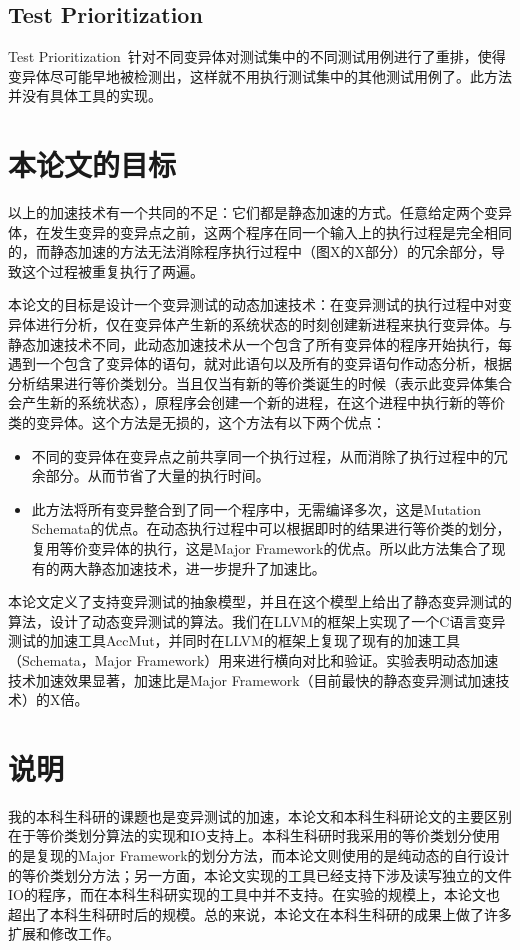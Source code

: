 \documentclass[nofonts]{ctexrep}
\begin{document}
\subsection{Test Prioritization}
Test Prioritization~\cite{zhang2013faster}针对不同变异体对测试集中的不同测试用例进行了重排，使得变异体尽可能早地被检测出，这样就不用执行测试集中的其他测试用例了。此方法并没有具体工具的实现。


\section{本论文的目标}
以上的加速技术有一个共同的不足：它们都是静态加速的方式。任意给定两个变异体，在发生变异的变异点之前，这两个程序在同一个输入上的执行过程是完全相同的，而静态加速的方法无法消除程序执行过程中（图X的X部分）的冗余部分，导致这个过程被重复执行了两遍。

本论文的目标是设计一个变异测试的动态加速技术：在变异测试的执行过程中对变异体进行分析，仅在变异体产生新的系统状态的时刻创建新进程来执行变异体。与静态加速技术不同，此动态加速技术从一个包含了所有变异体的程序开始执行，每遇到一个包含了变异体的语句，就对此语句以及所有的变异语句作动态分析，根据分析结果进行等价类划分。当且仅当有新的等价类诞生的时候（表示此变异体集合会产生新的系统状态），原程序会创建一个新的进程，在这个进程中执行新的等价类的变异体。这个方法是无损的，这个方法有以下两个优点：
\begin{itemize}
\item 不同的变异体在变异点之前共享同一个执行过程，从而消除了执行过程中的冗余部分。从而节省了大量的执行时间。
\item 此方法将所有变异整合到了同一个程序中，无需编译多次，这是Mutation Schemata的优点。在动态执行过程中可以根据即时的结果进行等价类的划分，复用等价变异体的执行，这是Major Framework的优点。所以此方法集合了现有的两大静态加速技术，进一步提升了加速比。
\end{itemize}

本论文定义了支持变异测试的抽象模型，并且在这个模型上给出了静态变异测试的算法，设计了动态变异测试的算法。我们在LLVM的框架上实现了一个C语言变异测试的加速工具AccMut，并同时在LLVM的框架上复现了现有的加速工具（Schemata，Major Framework）用来进行横向对比和验证。实验表明动态加速技术加速效果显著，加速比是Major Framework（目前最快的静态变异测试加速技术）的X倍。

\section*{说明}
我的本科生科研的课题也是变异测试的加速，本论文和本科生科研论文的主要区别在于等价类划分算法的实现和IO支持上。本科生科研时我采用的等价类划分使用的是复现的Major Framework的划分方法，而本论文则使用的是纯动态的自行设计的等价类划分方法；另一方面，本论文实现的工具已经支持下涉及读写独立的文件IO的程序，而在本科生科研实现的工具中并不支持。在实验的规模上，本论文也超出了本科生科研时后的规模。总的来说，本论文在本科生科研的成果上做了许多扩展和修改工作。
\end{document}
